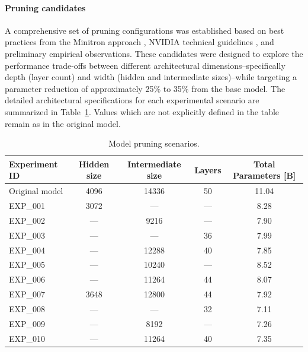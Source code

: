 \documentclass{article}
\begin{document}
\paragraph{Pruning candidates}
A comprehensive set of pruning configurations was established based on best practices from the Minitron approach \cite{sreenivas2024llm, muralidharan2024compact}, NVIDIA technical guidelines \cite{pruning_guidelines}, and preliminary empirical observations. These candidates were designed to explore the performance trade-offs between different architectural dimensions--specifically depth (layer count) and width (hidden and intermediate sizes)--while targeting a parameter reduction of approximately 25\% to 35\% from the base model. The detailed architectural specifications for each experimental scenario are summarized in Table~\ref{tab:pruning_scenarios}. Values which are not explicitly defined in the table remain as in the original model.

\begin{table}[h]
    \centering
    \begin{tabular}{lcccc}
        \toprule
        \textbf{Experiment ID} & \textbf{Hidden size} & \textbf{Intermediate size} & \textbf{Layers} & \textbf{Total Parameters [B]} \\
        \midrule
        Original model & 4096 & 14336 & 50 & 11.04 \\
        \midrule
        EXP\_001  & 3072 & ---   & --- & 8.28 \\
        EXP\_002  & ---  & 9216  & --- & 7.90 \\
        EXP\_003  & ---  & ---   & 36  & 7.99 \\
        EXP\_004  & ---  & 12288 & 40  & 7.85 \\
        EXP\_005  & ---  & 10240 & --- & 8.52 \\
        EXP\_006  & ---  & 11264 & 44  & 8.07 \\
        EXP\_007  & 3648 & 12800 & 44  & 7.92 \\
        EXP\_008  & ---  & ---   & 32  & 7.11 \\
        EXP\_009  & ---  & 8192  & --- & 7.26 \\
        EXP\_010  & ---  & 11264 & 40  & 7.35 \\
        \bottomrule
    \end{tabular}
    \caption{Model pruning scenarios.}
    \label{tab:pruning_scenarios}
\end{table}
\end{document}
